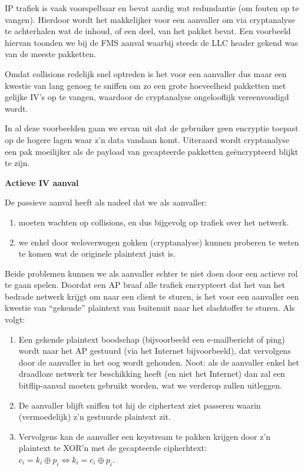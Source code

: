 \documentclass[
  10pt,
  dutch,
  paper=a4,
  ,captions=tableheading
]{scrbook}
\providecommand{\tightlist}{%
  \setlength{\itemsep}{0pt}\setlength{\parskip}{0pt}}
\begin{document}
IP trafiek is vaak voorspelbaar en bevat aardig wat redundantie (om
fouten op te vangen). Hierdoor wordt het makkelijker voor een aanvaller
om via cryptanalyse te achterhalen wat de inhoud, of een deel, van het
pakket bevat. Een voorbeeld hiervan toonden we bij de FMS aanval waarbij
steeds de LLC header gekend was van de meeste pakketten.

Omdat collisions redelijk snel optreden is het voor een aanvaller dus
maar een kwestie van lang genoeg te sniffen om zo een grote hoeveelheid
pakketten met gelijke IV's op te vangen, waardoor de cryptanalyse
ongelooflijk vereenvoudigd wordt.

\begin{noteblock}
In al deze voorbeelden gaan we ervan uit dat de gebruiker geen encryptie
toepast op de hogere lagen waar z'n data vandaan komt. Uiteraard wordt
cryptanalyse een pak moeilijker als de payload van gecapteerde pakketten
geëncrypteerd blijkt te zijn.
\end{noteblock}

\textbf{Actieve IV aanval}

De passieve aanval heeft als nadeel dat we als aanvaller:

\begin{enumerate}
\def\labelenumi{\arabic{enumi}.}
\tightlist
\item
  moeten wachten op collisions, en dus bijgevolg op trafiek over het
  netwerk.
\item
  we enkel door weloverwogen gokken (cryptanalyse) kunnen proberen te
  weten te komen wat de originele plaintext juist is.
\end{enumerate}

Beide problemen kunnen we als aanvaller echter te niet doen door een
actieve rol te gaan spelen. Doordat een AP braaf alle trafiek
encrypteert dat het van het bedrade netwerk krijgt om naar een client te
sturen, is het voor een aanvaller een kwestie van ``gekende'' plaintext
van buitenuit naar het slachtoffer te sturen. Als volgt:

\begin{enumerate}
\def\labelenumi{\arabic{enumi}.}
\tightlist
\item
  Een gekende plaintext boodschap (bijvoorbeeld een e-mailbericht of
  ping) wordt naar het AP gestuurd (via het Internet bijvoorbeeld), dat
  vervolgens door de aanvaller in het oog wordt gehouden. Noot: als de
  aanvaller enkel het draadloze netwerk ter beschikking heeft (en niet
  het Internet) dan zal een bitflip-aanval moeten gebruikt worden, wat
  we verderop zullen uitleggen.
\item
  De aanvaller blijft sniffen tot hij de ciphertext ziet passeren waarin
  (vermoedelijk) z'n gestuurde plaintext zit.
\item
  Vervolgens kan de aanvaller een keystream te pakken krijgen door z'n
  plaintext te XOR'n met de gecapteerde cipherhtext:
  \(c_i = k_i \oplus p_i \Leftrightarrow k_i = c_i \oplus p_i\).
\end{enumerate}
\end{document}
